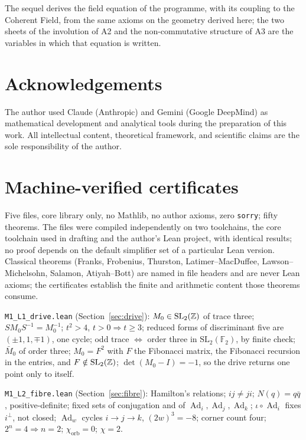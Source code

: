 \documentclass[11pt,a4paper]{article}
\theoremstyle{plain}
\theoremstyle{definition}
\theoremstyle{remark}
\newcommand{\Ad}{\operatorname{Ad}}
\begin{document}
The sequel derives the field equation of the programme, with its coupling to the Coherent Field, from the same axioms on the geometry derived here; the two sheets of the involution of A2 and the non-commutative structure of A3 are the variables in which that equation is written.

\section*{Acknowledgements}
The author used Claude (Anthropic) and Gemini (Google DeepMind) as mathematical development and analytical tools during the preparation of this work. All intellectual content, theoretical framework, and scientific claims are the sole responsibility of the author.

\appendix

\section{Machine-verified certificates}\label{app:lean}

Five files, core library only, no Mathlib, no author axioms, zero \texttt{sorry}; fifty theorems. The files were compiled independently on two toolchains, the core toolchain used in drafting and the author's Lean project, with identical results; no proof depends on the default simplifier set of a particular Lean version. Classical theorems (Franks, Frobenius, Thurston, Latimer--MacDuffee, Lawson--Michelsohn, Salamon, Atiyah--Bott) are named in file headers and are never Lean axioms; the certificates establish the finite and arithmetic content those theorems consume.

\texttt{M1\_L1\_drive.lean} (Section~\ref{sec:drive}): $M_{0}\in\mathrm{SL}_{2}(\mathbb{Z})$ of trace three; $SM_{0}S^{-1}=M_{0}^{-1}$; $t^{2}>4$, $t>0\Rightarrow t\geq3$; reduced forms of discriminant five are $(\pm1,1,\mp1)$, one cycle; odd trace $\Leftrightarrow$ order three in $\mathrm{SL}_{2}(\mathbb{F}_{2})$, by finite check; $\bar M_{0}$ of order three; $M_{0}=F^{2}$ with $F$ the Fibonacci matrix, the Fibonacci recursion in the entries, and $F\notin\mathrm{SL}_{2}(\mathbb{Z})$; $\det(M_{0}-I)=-1$, so the drive returns one point only to itself.

\texttt{M1\_L2\_fibre.lean} (Section~\ref{sec:fibre}): Hamilton's relations; $ij\neq ji$; $N(q)=q\bar q$, positive-definite; fixed sets of conjugation and of $\Ad_{i},\Ad_{j},\Ad_{k}$; $\iota\circ\Ad_{i}$ fixes $i^{\perp}$, not closed; $\Ad_{w}$ cycles $i\to j\to k$, $(2w)^{3}=-8$; corner count four; $2^{n}=4\Rightarrow n=2$; $\chi_{\mathrm{orb}}=0$; $\chi=2$.
\end{document}

